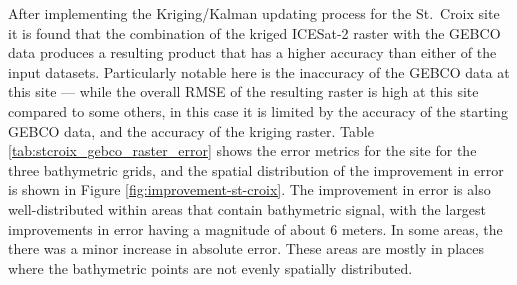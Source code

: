 After implementing the Kriging/Kalman updating process for the St.~Croix site it is found that the combination of the kriged ICESat-2 raster with the GEBCO data produces a resulting product that has a higher accuracy than either of the input datasets. Particularly notable here is the inaccuracy of the GEBCO data at this site --- while the overall RMSE of the resulting raster is high at this site compared to some others, in this case it is limited by the accuracy of the starting GEBCO data, and the accuracy of the kriging raster. Table \ref{tab:stcroix_gebco_raster_error} shows the error metrics for the site for the three bathymetric grids, and the spatial distribution of the improvement in error is shown in Figure \ref{fig:improvement-st-croix}. The improvement in error is also well-distributed within areas that contain bathymetric signal, with the largest improvements in error having a magnitude of about 6 meters. In some areas, the there was a minor increase in absolute error. These areas are mostly in places where the bathymetric points are not evenly spatially distributed.


\begin{figure}[htbp]
    \begin{floatrow}
    \end{floatrow}
\end{figure}



